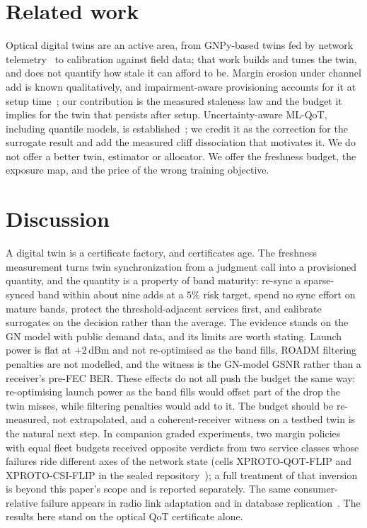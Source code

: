 \documentclass[10pt,twocolumn]{article}
\begin{document}
\section{Related work}
Optical digital twins are an active area, from GNPy-based twins fed by network
telemetry~\cite{dtwin} to calibration against field data; that work builds and
tunes the twin, and does not quantify how stale it can afford to be. Margin erosion
under channel add is known qualitatively, and impairment-aware provisioning
accounts for it at setup time~\cite{pointon}; our contribution is the measured
staleness law and the budget it implies for the twin that persists after setup.
Uncertainty-aware ML-QoT, including quantile models, is
established~\cite{quantileqot,mlqot}; we credit it as the correction for the
surrogate result and add the measured cliff dissociation that motivates it. We do
not offer a better twin, estimator or allocator. We offer the freshness budget, the
exposure map, and the price of the wrong training objective.

\section{Discussion}
A digital twin is a certificate factory, and certificates age. The freshness
measurement turns twin synchronization from a judgment call into a provisioned
quantity, and the quantity is a property of band maturity: re-sync a
sparse-synced band within about nine adds at a $5\%$ risk target, spend no
sync effort on mature bands, protect the threshold-adjacent services first, and
calibrate surrogates on the decision rather than the average. The evidence stands on the GN model with public demand data, and its
limits are worth stating. Launch power is flat at $+2$\,dBm and not re-optimised as
the band fills, ROADM filtering penalties are not modelled, and the witness is the
GN-model GSNR rather than a receiver's pre-FEC BER. These effects do not all push
the budget the same way: re-optimising launch power as the band fills would offset
part of the drop the twin misses, while filtering penalties would add to it. The
budget should be re-measured, not extrapolated, and a coherent-receiver witness on
a testbed twin is the natural next step. In companion graded experiments, two
margin policies with equal fleet budgets received opposite verdicts from two
service classes whose failures ride different axes of the network state (cells
XPROTO-QOT-FLIP and XPROTO-CSI-FLIP in the sealed
repository~\cite{otcampaigns}); a full treatment of that inversion is beyond this
paper's scope and is reported separately. The same consumer-relative failure
appears in radio link adaptation and in database
replication~\cite{otcampaigns}. The results here stand on the optical QoT
certificate alone.
\end{document}
